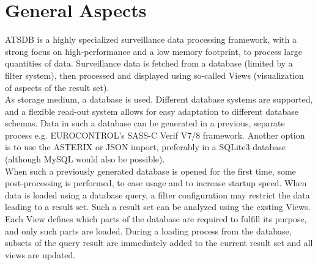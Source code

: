 \section{General Aspects}
ATSDB is a highly specialized surveillance data processing framework, with a strong focus on high-performance and a low memory footprint,  to process large quantities of data. Surveillance data is fetched from a database (limited by a filter system), then processed and displayed using so-called Views (visualization of aspects of the result set).\\

As storage medium, a database is used.  Different database systems are supported, and a flexible read-out system allows for easy adaptation to different database schemas.  Data in such a database can be generated in a previous, separate process e.g. EUROCONTROL's SASS-C Verif V7/8 framework. Another option is to use the ASTERIX or JSON import, preferably in a SQLite3 database (although MySQL would also be possible).\\

When such a previously generated database is opened for the first time, some post-processing is performed, to ease usage and to increase startup speed.  When data is loaded using a database query, a filter configuration may restrict the data leading to a result set.  Such a result set can be analyzed using the exsting Views.\\

Each View defines which parts of the database are required to fulfill its purpose, and only such parts are loaded.  During a loading process from the database, subsets of the query result are immediately added to the current result set and all views are updated.  
